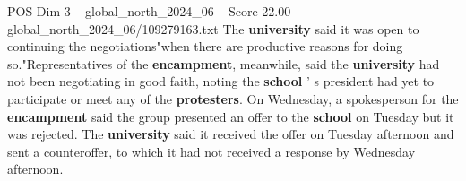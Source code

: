 \begin{textsample}{POS Dim 3 – global\_north\_2024\_06 – Score 22.00 – global\_north\_2024\_06/109279163.txt}
The \textbf{university} said it was open to continuing the negotiations"when there are productive reasons for doing so."Representatives of the \textbf{encampment}, meanwhile, said the \textbf{university} had not been negotiating in good faith, noting the \textbf{school} ' s president had yet to participate or meet any of the \textbf{protesters}.
On Wednesday, a spokesperson for the \textbf{encampment} said the group presented an offer to the \textbf{school} on Tuesday but it was rejected.
The \textbf{university} said it received the offer on Tuesday afternoon and sent a counteroffer, to which it had not received a response by Wednesday afternoon.

\end{textsample}
